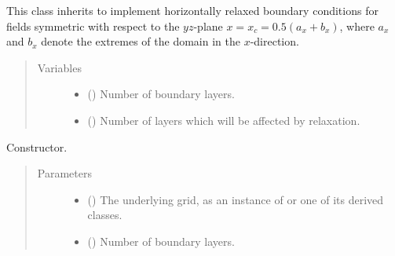 \documentclass[letterpaper,10pt,english]{sphinxmanual}
\begin{document}
\begin{fulllineitems}
\label{\detokenize{api:dycore.horizontal_boundary.RelaxedSymmetricYZ}}
This class inherits {\hyperref[\detokenize{api:dycore.horizontal_boundary.Relaxed}]{}} to implement horizontally relaxed boundary conditions
for fields symmetric with respect to the \(yz\)-plane \(x = x_c = 0.5 (a_x + b_x)\),
where \(a_x\) and \(b_x\) denote the extremes of the domain in the \(x\)-direction.
\begin{quote}\begin{description}
\item[{Variables}] \leavevmode\begin{itemize}
\item {} 
{\hyperref[\detokenize{api:dycore.prognostic_isentropic.PrognosticIsentropic.nb}]{}} () \textendash{} Number of boundary layers.

\item {} 
 () \textendash{} Number of layers which will be affected by relaxation.

\end{itemize}

\end{description}\end{quote}

\begin{fulllineitems}
\label{\detokenize{api:dycore.horizontal_boundary.RelaxedSymmetricYZ.__init__}}
Constructor.
\begin{quote}\begin{description}
\item[{Parameters}] \leavevmode\begin{itemize}
\item {} 
 () \textendash{} The underlying grid, as an instance of {\hyperref[\detokenize{api:grids.grid_xyz.GridXYZ}]{}} or one of its derived classes.

\item {} 
 () \textendash{} Number of boundary layers.


\end{itemize}
\end{description}
\end{quote}
\end{fulllineitems}
\end{fulllineitems}
\end{document}
